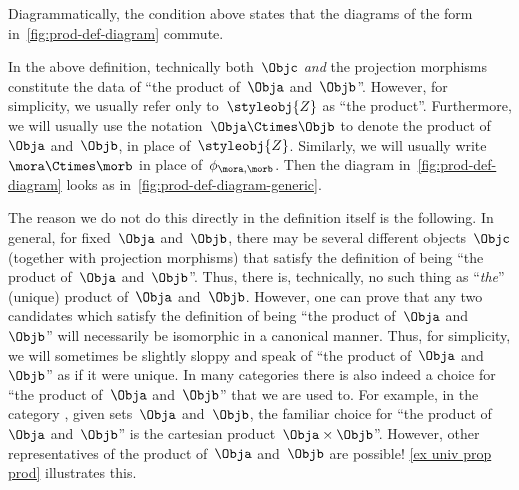 \begin{marginfigure}
  \centering
  \caption{}
  \label{fig:prod-def-diagram}
\end{marginfigure}
\begin{remark}\label{re:prod-comm-diag}
  Diagrammatically, the condition above states that the diagrams of the form
  in~\cref{fig:prod-def-diagram} commute.
\end{remark}

\begin{marginfigure}
  \begin{center}
\end{center}
    \caption{\label{fig:prod-def-diagram-generic}}
  \end{marginfigure}

\begin{remark}
  \label{prod unique up to iso}
  In the above definition, technically both~$\Objc$ \emph{and} the projection morphisms constitute the data of ``the product of~$\Obja$ and~$\Objb$''.
  However, for simplicity, we usually refer only to~$\styleobj{Z}$ as ``the product''.
  Furthermore, we will usually use the notation~$\Obja \Ctimes \Objb$ to denote the product of~$\Obja$ and~$\Objb$, in place of~$\styleobj{Z}$.
  Similarly, we will usually write~$\mora \Ctimes \morb$ in place of~$\phi_{\mora, \morb}$. Then the diagram in~\cref{fig:prod-def-diagram} looks as in~\cref{fig:prod-def-diagram-generic}.

The reason we do not do this directly in the definition itself is the following.
In general, for fixed~$\Obja$ and~$\Objb$, there may be several different objects~$\Objc$ (together with projection morphisms) that satisfy the definition of being ``the product of~$\Obja$ and~$\Objb$''.
  Thus, there is, technically, no such thing as ``\emph{the}'' (unique) product of~$\Obja$ and~$\Objb$.
  However, one can prove that any two candidates which satisfy the definition of being ``the product of~$\Obja$ and~$\Objb$'' will necessarily be isomorphic in a canonical manner.
  Thus, for simplicity, we will sometimes be slightly sloppy and speak of ``the product of~$\Obja$ and~$\Objb$'' as if it were unique.
  In many categories there is also indeed a choice for ``the product of~$\Obja$ and~$\Objb$'' that we are used to.
  For example, in the category \Set, given sets~$\Obja$ and~$\Objb$, the familiar choice for ``the product of~$\Obja$ and~$\Objb$'' is the cartesian product~$\Obja \times \Objb$''.
  However, other representatives of the product of~$\Obja$ and~$\Objb$ are possible! \cref{ex univ prop prod} illustrates this.
\end{remark}

